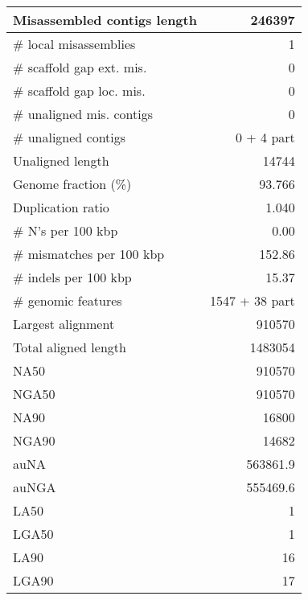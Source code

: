 \documentclass[12pt,a4paper]{article}
\begin{document}
\begin{table}[ht]
\begin{center}
\begin{tabular}{|l*{1}{|r}|}
Misassembled contigs length & 246397 \\ \hline
\# local misassemblies & 1 \\ \hline
\# scaffold gap ext. mis. & 0 \\ \hline
\# scaffold gap loc. mis. & 0 \\ \hline
\# unaligned mis. contigs & 0 \\ \hline
\# unaligned contigs & 0 + 4 part \\ \hline
Unaligned length & 14744 \\ \hline
Genome fraction (\%) & 93.766 \\ \hline
Duplication ratio & 1.040 \\ \hline
\# N's per 100 kbp & 0.00 \\ \hline
\# mismatches per 100 kbp & 152.86 \\ \hline
\# indels per 100 kbp & 15.37 \\ \hline
\# genomic features & 1547 + 38 part \\ \hline
Largest alignment & 910570 \\ \hline
Total aligned length & 1483054 \\ \hline
NA50 & 910570 \\ \hline
NGA50 & 910570 \\ \hline
NA90 & 16800 \\ \hline
NGA90 & 14682 \\ \hline
auNA & 563861.9 \\ \hline
auNGA & 555469.6 \\ \hline
LA50 & 1 \\ \hline
LGA50 & 1 \\ \hline
LA90 & 16 \\ \hline
LGA90 & 17 \\ \hline
\end{tabular}
\end{center}
\end{table}
\end{document}
